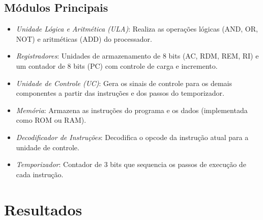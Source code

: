 \documentclass[12pt, fleqn]{article}
\begin{document}
\subsection{Módulos Principais}

\begin{itemize}
    \item \textit{Unidade Lógica e Aritmética (ULA)}: Realiza as operações lógicas (AND, OR, NOT) e aritméticas (ADD) do processador.
    \item \textit{Registradores}: Unidades de armazenamento de 8 bits (AC, RDM, REM, RI) e um contador de 8 bits (PC) com controle de carga e incremento.
    \item \textit{Unidade de Controle (UC)}: Gera os sinais de controle para os demais componentes a partir das instruções e dos passos do temporizador.
    \item \textit{Memória}: Armazena as instruções do programa e os dados (implementada como ROM ou RAM).
    \item \textit{Decodificador de Instruções}: Decodifica o opcode da instrução atual para a unidade de controle.
    \item \textit{Temporizador}: Contador de 3 bits que sequencia os passos de execução de cada instrução.
\end{itemize}

\section{Resultados}
\end{document}
